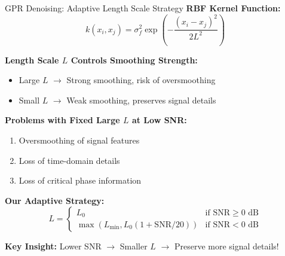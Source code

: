 \documentclass[aspectratio=169]{beamer}
\begin{document}
\begin{frame}{GPR Denoising: Adaptive Length Scale Strategy}
\textbf{RBF Kernel Function:}
\begin{equation}
k(x_i, x_j) = \sigma_f^2 \exp\left(-\frac{(x_i - x_j)^2}{2L^2}\right)
\end{equation}

\vspace{0.3cm}
\textbf{Length Scale $L$ Controls Smoothing Strength:}
\begin{itemize}
\item Large $L$ $\rightarrow$ Strong smoothing, risk of oversmoothing
\item Small $L$ $\rightarrow$ Weak smoothing, preserves signal details
\end{itemize}

\vspace{0.3cm}
\textbf{Problems with Fixed Large $L$ at Low SNR:}
\begin{enumerate}
\item \textcolor{zjutred}{Oversmoothing of signal features}
\item \textcolor{zjutred}{Loss of time-domain details}
\item \textcolor{zjutred}{Loss of critical phase information}
\end{enumerate}

\vspace{0.3cm}
\textbf{Our Adaptive Strategy:}
\begin{equation}
L = \begin{cases}
L_0 & \text{if SNR} \geq 0 \text{ dB} \\
\max(L_{\min}, L_0(1 + \text{SNR}/20)) & \text{if SNR} < 0 \text{ dB}
\end{cases}
\end{equation}

\textcolor{zjutgreen}{\textbf{Key Insight:}} Lower SNR $\rightarrow$ Smaller $L$ $\rightarrow$ Preserve more signal details!
\end{frame}
\end{document}
